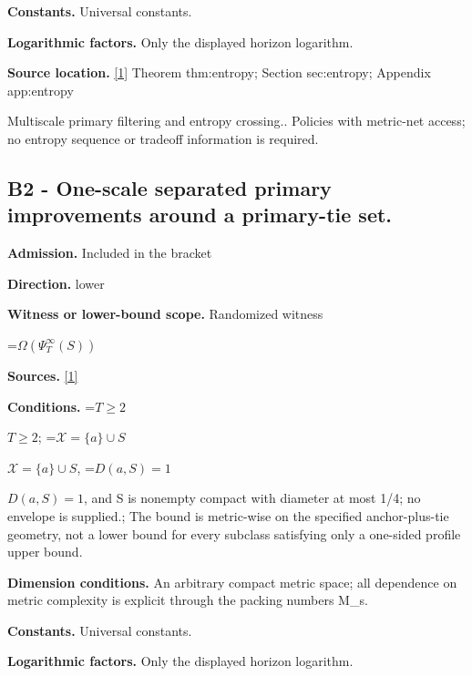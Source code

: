 \documentclass[10pt,a4paper]{article}
\newcommand{\AtlasMath}[1]{\par\begingroup\centering\setbox0=\hbox{$\displaystyle #1$}\ifdim\wd0>1.4\linewidth\typeout{ATLAS WIDE FORMULA: \the\wd0}\fi\ifdim\wd0>\linewidth\resizebox{\linewidth}{!}{\box0}\else\box0\fi\par\endgroup}
\newcommand{\AtlasInlineMath}[1]{\begingroup\setbox0=\hbox{$#1$}\ifdim\wd0>.4\linewidth\endgroup\AtlasMath{#1}\else\endgroup$#1$\fi}
\begin{document}
\textbf{Constants.} Universal constants.



\textbf{Logarithmic factors.} Only the displayed horizon logarithm.



\textbf{Source location.} \href{https://github.com/WU-Wendao/Colombo/blob/main/colombo_sensorium/Complexity_altas/data/sources/colombo/U07/manuscript.pdf}{[1]} Theorem thm:entropy; Section sec:entropy; Appendix app:entropy



Multiscale primary filtering and entropy crossing.. Policies with metric-net access; no entropy sequence or tradeoff information is required.



\subsection{B2 - One-scale separated primary improvements around a primary-tie set.}


\textbf{Admission.} Included in the bracket



\textbf{Direction.} lower



\textbf{Witness or lower-bound scope.} Randomized witness



\AtlasMath{\Omega(\Psi_T^\infty(S))}


\textbf{Sources.} \href{https://github.com/WU-Wendao/Colombo/blob/main/colombo_sensorium/Complexity_altas/data/sources/colombo/U07/manuscript.pdf}{[1]}



\textbf{Conditions.} \AtlasInlineMath{T\ge2}; \AtlasInlineMath{\mathcal X=\{a\}\cup S}, \AtlasInlineMath{D(a,S)=1}, and S is nonempty compact with diameter at most 1/4; no envelope is supplied.; The bound is metric-wise on the specified anchor-plus-tie geometry, not a lower bound for every subclass satisfying only a one-sided profile upper bound.



\textbf{Dimension conditions.} An arbitrary compact metric space; all dependence on metric complexity is explicit through the packing numbers M\_s.



\textbf{Constants.} Universal constants.



\textbf{Logarithmic factors.} Only the displayed horizon logarithm.
\end{document}
